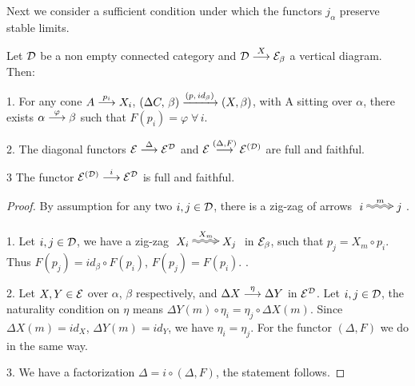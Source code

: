 Next we consider a sufficient condition under which the functors $j_\alpha$ preserve stable limits.
 
\begin{proposition} \label{ifconnected}
Let $\mathcal{D}$ be a non empty connected category and 
$\mathcal{D} \overset {X} {\longrightarrow} \mathcal{E}_\beta$ a vertical diagram. Then:

1.  For any cone 
$A \overset {p_i} {\longrightarrow} X_i$, 
\mbox{$(\Delta C, \, \beta) \xrightarrow{(p,\, id_\beta)} (X, \beta)$}, with A sitting over $\alpha$, there exists 
$\alpha \overset {\varphi} {\longrightarrow} \beta$ such  that 
$F(p_i) = \varphi \; \forall\, i$.


2. The diagonal functors  $\mathcal{E} \overset {\Delta} {\longrightarrow} \mathcal{E}^\mathcal{D}$ and 
$\mathcal{E} \overset {(\Delta, F)} {\longrightarrow} \mathcal{E}^{(\mathcal{D})}$ are full and faithful.


3 The functor   
$\mathcal{E}^{(\mathcal{D})} \overset {i} {\longrightarrow} \mathcal{E}^{\mathcal{D}}$ is full and faithful. 
\end{proposition}
%
\begin{proof}
By assumption for any two $i, j \in \mathcal{D}$, there is a zig-zag of arrows  $\xymatrix{{i} \ar@2{~>}@<0.25ex>[r]^{{m}} & {j}}$.

1. Let $i, j \in \mathcal{D}$, we have a zig-zag 
$\xymatrix{{X_i} \ar@2{~>}@<0.25ex>[r]^{{X_m}} & {X_j}}$ in $\mathcal{E}_\beta$, such that 
 $p_j = X_m \circ p_i$. Thus  $F(p_j) = id_\beta  \circ F(p_i)$,  
 $F(p_j) = F(p_i)$.
.
 \vspace{1ex}
 
 2. Let $X,Y \in \mathcal{E}$ over $\alpha$, $\beta$ respectively, and 
 $\Delta X  \overset {\eta} {\longrightarrow} \Delta Y$ in 
 $\mathcal{E}^{\mathcal{D}}$. Let $i, j \in \mathcal{D}$, the naturality condition on $\eta$ means 
 $\Delta Y(m) \circ \eta_i = \eta_j \circ \Delta X(m)$. Since $\Delta X(m) = id_X$, $\Delta Y(m) = id_Y$, we have  $\eta_i = \eta_j$. 
For the functor $(\Delta, F)$ we do in the same way. 

\vspace{1ex}

3. We have a factorization $\Delta = i \circ (\Delta, F)$, the statement follows.
\end{proof} 
   
